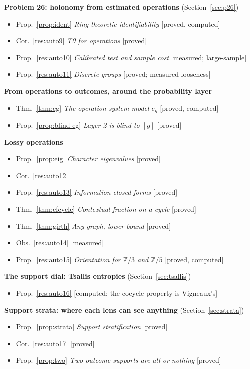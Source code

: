 \documentclass[11pt]{article}
\theoremstyle{definition}
\theoremstyle{remark}
\newcommand{\Z}{\mathbb{Z}}
\begin{document}
\noindent\textbf{Problem 26: holonomy from estimated operations} (Section~\ref{sec:p26})
\begin{itemize}[itemsep=0pt]
  \item Prop.~\ref{prop:ident} \emph{Ring-theoretic identifiability} [proved, computed]
  \item Cor.~\ref{res:auto9} \emph{T0 for operations} [proved]
  \item Prop.~\ref{res:auto10} \emph{Calibrated test and sample cost} [measured; large-sample]
  \item Prop.~\ref{res:auto11} \emph{Discrete groups} [proved; measured looseness]
\end{itemize}
\noindent\textbf{From operations to outcomes, around the probability layer}
\begin{itemize}[itemsep=0pt]
  \item Thm.~\ref{thm:eg} \emph{The operation-system model $e_g$} [proved, computed]
  \item Prop.~\ref{prop:blind-eg} \emph{Layer 2 is blind to {$[g]$}} [proved]
\end{itemize}
\noindent\textbf{Lossy operations}
\begin{itemize}[itemsep=0pt]
  \item Prop.~\ref{prop:eig} \emph{Character eigenvalues} [proved]
  \item Cor.~\ref{res:auto12}
  \item Prop.~\ref{res:auto13} \emph{Information closed forms} [proved]
  \item Thm.~\ref{thm:cfcycle} \emph{Contextual fraction on a cycle} [proved]
  \item Thm.~\ref{thm:girth} \emph{Any graph, lower bound} [proved]
  \item Obs.~\ref{res:auto14} [measured]
  \item Prop.~\ref{res:auto15} \emph{Orientation for $\Z/3$ and $\Z/5$} [proved, computed]
\end{itemize}
\noindent\textbf{The support dial: Tsallis entropies} (Section~\ref{sec:tsallis})
\begin{itemize}[itemsep=0pt]
  \item Prop.~\ref{res:auto16} [computed; the cocycle property is Vigneaux's]
\end{itemize}
\noindent\textbf{Support strata: where each lens can see anything} (Section~\ref{sec:strata})
\begin{itemize}[itemsep=0pt]
  \item Prop.~\ref{prop:strata} \emph{Support stratification} [proved]
  \item Cor.~\ref{res:auto17} [proved]
  \item Prop.~\ref{prop:two} \emph{Two-outcome supports are all-or-nothing} [proved]
\end{itemize}
\end{document}

